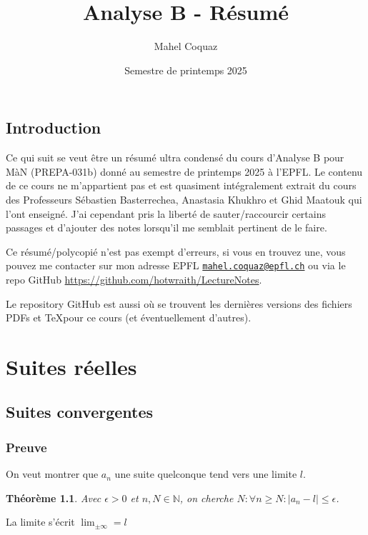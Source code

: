 \documentclass[10pt,a4paper]{book}
\title{Analyse B \vspace{0.2cm} - Résumé}
\author{Mahel Coquaz}
\date{Semestre de printemps 2025}
\newcommand{\N}{\mathbb{N}}
\newtheorem{theorem}{Théorème}[section]
\begin{document}
\maketitle
\tableofcontents
\newpage

\section*{Introduction}

Ce qui suit se veut être un résumé ultra condensé du cours d'Analyse B pour MàN (PREPA-031b) donné au semestre de printemps 2025 à l'EPFL. Le contenu de ce cours ne m'appartient pas et est quasiment intégralement extrait du cours des Professeurs Sébastien Basterrechea, Anastasia Khukhro et Ghid Maatouk qui l'ont enseigné. J'ai cependant pris la liberté de sauter/raccourcir certains passages et d'ajouter des notes lorsqu'il me semblait pertinent de le faire. \par
Ce résumé/polycopié n'est pas exempt d'erreurs, si vous en trouvez une, vous pouvez me contacter sur mon adresse EPFL \texttt{\href{mailto:mahel.coquaz@epfl.ch}{mahel.coquaz@epfl.ch}} ou via le repo GitHub \url{https://github.com/hotwraith/LectureNotes}. \par
Le repository GitHub est aussi où se trouvent les dernières versions des fichiers PDFs et \TeX pour ce cours (et éventuellement d'autres).

\chapter{Suites réelles}

\section{Suites convergentes}

\subsection{Preuve} \label{thm:limites}
On veut montrer que \(a_n\) une suite quelconque tend vers une limite $l$.
\begin{theorem}
Avec $\epsilon > 0$ et $n,N \in \N$, on cherche $N: \forall n \geq N: \left| a_n - l \right| \leq \epsilon$.
\end{theorem}
La limite s'écrit $\lim_{\pm \infty} = l$
\end{document}
